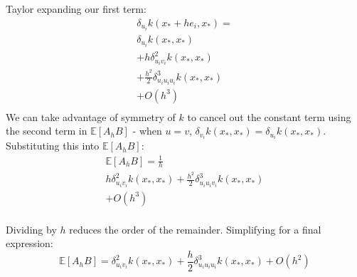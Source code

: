 Taylor expanding our first term:
\begin{equation*}
    \begin{aligned}
        \delta_{u_i} k(x_* + h e_i, x_*) = \\
        \delta_{u_i} k(x_*, x_*) \\
        + h \delta_{u_i v_i}^2 k(x_*, x_*) \\
        + \frac{h^2}{2} \delta_{u_i u_i u_i}^3 k(x_*, x_*) \\
        + O(h^3) \\
    \end{aligned}
\end{equation*}
We can take advantage of symmetry of $k$ to cancel out the constant term using the second term in $\mathbb{E}[A_hB]$ - when $u = v$, $\delta_{v_i} k(x_*, x_*) = \delta_{u_i} k(x_*, x_*)$. Substituting this into $\mathbb{E}[A_h B]$:
\begin{equation*}
    \begin{aligned}
        \mathbb{E}[A_h B] = \frac{1}{h} \\
        h \delta_{u_i v_i}^2 k(x_*, x_*)
        + \frac{h^2}{2} \delta_{u_i u_i v_i}^3 k(x_*, x_*) \\
        + O(h^3) \\
    \end{aligned}
\end{equation*}

Dividing by $h$ reduces the order of the remainder. Simplifying for a final expression:
\begin{equation} \label{eq:msd_ab_final}
    \mathbb{E}[A_h B] = \delta_{u_i v_i}^2 k(x_*, x_*) + \frac{h}{2} \delta_{u_i u_i u_i}^3 k(x_*, x_*) + O(h^2)
\end{equation}

